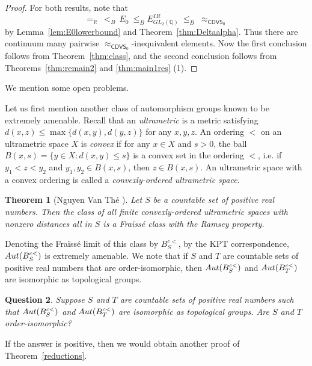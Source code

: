 \documentclass{amsart}
\newtheorem{theorem}{Theorem}[section]
\newtheorem{question}[theorem]{Question}
\theoremstyle{definition}
\theoremstyle{remark}
\begin{document}
\begin{proof} For both results, note that
$$ =_{\mathbb{R}}\ <_B\,E_0\ \leq_B  E^{IR}_{GL_2(\mathbb{Q})}\ \leq_B\ \approx_{\mathsf{CDVS}_0} $$
by Lemma~\ref{lem:E0lowerbound} and Theorem~\ref{thm:Deltaalpha}. Thus there are continuum many pairwise $\approx_{\mathsf{CDVS}_0}$-inequivalent elements. Now the first conclusion follows from Theorem~\ref{thm:class}, and the second conclusion follows from Theorems~\ref{thm:remain2} and \ref{thm:main1res} (1). 
\end{proof}

We mention some open problems. 

Let us first mention another class of automorphism groups known to be extremely amenable. Recall that an {\em ultrametric} is a metric satisfying $d(x,z) \leq \max\{d(x,y), d(y,z)\}$ for any $x,y,z$. An ordering $<$ on an ultrametric space $X$ is {\em convex} if for any $x\in X$ and $s > 0$, the ball $B(x,s)=\{y \in X: d(x,y) \leq s\}$ is a convex set in the ordering $<$, i.e. if $y_1<z<y_2$ and $y_1,y_2\in B(x,s)$, then $z\in B(x,s)$. An ultrametric space with a convex ordering is called a {\em convexly-ordered ultrametric space}.

     \begin{theorem}[Nguyen Van Th\'e \cite{NVT2}]
        Let $S$ be a countable set of positive real numbers. Then the class of all finite convexly-ordered ultrametric spaces with nonzero distances all in $S$ is a Fra\"iss\'e class with the Ramsey property. 
     \end{theorem}

   Denoting the Fra\"iss\'e limit of this class by $B_S^{c<}$, by the KPT correspondence,  ${\rm Aut}(B_S^{c<})$ is extremely amenable. We note that if $S$ and $T$ are countable sets of positive real numbers that are order-isomorphic, then ${\rm Aut}(B_S^{c<})$ and ${\rm Aut}(B_T^{c<})$ are isomorphic as topological groups. 
  
  \begin{question} Suppose $S$ and $T$ are countable sets of positive real numbers such that ${\rm Aut}(B_S^{c<})$ and ${\rm Aut}(B_T^{c<})$ are isomorphic as topological groups. Are $S$ and $T$ order-isomorphic?
  \end{question}
  
   If the answer is positive, then we would obtain another proof of Theorem~\ref{reductions}.
\end{document}
